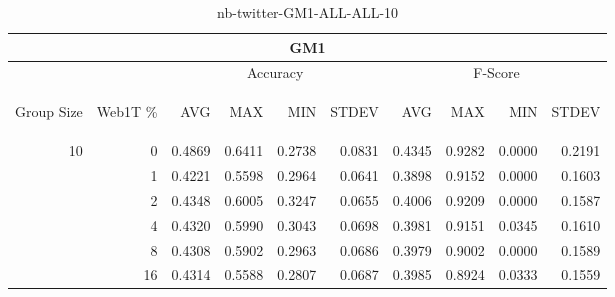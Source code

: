 \begin{center}
\begin{table}[htbp]
\begin{center}
\begin{tabular}{ | r | r | r | r | r | r | r | r | r | r |}
\hline
\multicolumn{10}{|c|}{GM1}\\
\hline
 & & \multicolumn{4}{|c|}{Accuracy} & \multicolumn{4}{|c|}{F-Score}\\ \cline{3-10}
\begin{sideways}Group Size\end{sideways} & \begin{sideways}Web1T \%\end{sideways} & \begin{sideways}AVG\end{sideways} & \begin{sideways}MAX\end{sideways} & \begin{sideways}MIN\end{sideways} & \begin{sideways}STDEV\end{sideways} & \begin{sideways}AVG\end{sideways} & \begin{sideways}MAX\end{sideways} & \begin{sideways}MIN\end{sideways} & \begin{sideways}STDEV\end{sideways}\\
\hline
\multirow{5}{*}{10}
 & 0 & 0.4869 & 0.6411 & 0.2738 & 0.0831 & 0.4345 & 0.9282 & 0.0000 & 0.2191\\ \cline{2-10}
 & 1 & 0.4221 & 0.5598 & 0.2964 & 0.0641 & 0.3898 & 0.9152 & 0.0000 & 0.1603\\ \cline{2-10}
 & 2 & 0.4348 & 0.6005 & 0.3247 & 0.0655 & 0.4006 & 0.9209 & 0.0000 & 0.1587\\ \cline{2-10}
 & 4 & 0.4320 & 0.5990 & 0.3043 & 0.0698 & 0.3981 & 0.9151 & 0.0345 & 0.1610\\ \cline{2-10}
 & 8 & 0.4308 & 0.5902 & 0.2963 & 0.0686 & 0.3979 & 0.9002 & 0.0000 & 0.1589\\ \cline{2-10}
 & 16 & 0.4314 & 0.5588 & 0.2807 & 0.0687 & 0.3985 & 0.8924 & 0.0333 & 0.1559\\ \cline{2-10}
\hline
\end{tabular}
\caption{nb-twitter-GM1-ALL-ALL-10}
\label{table:nb-twitter-GM1-ALL-ALL-10}
\end{center}
\end{table}
\end{center}

